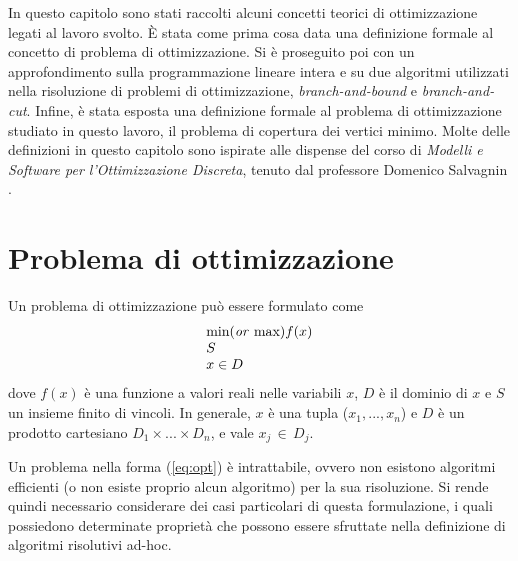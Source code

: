 In questo capitolo sono stati raccolti alcuni concetti teorici di ottimizzazione legati al lavoro svolto. È stata come prima cosa data una definizione formale al concetto di problema di ottimizzazione. Si è proseguito poi con un approfondimento sulla programmazione lineare intera e su due algoritmi utilizzati nella risoluzione di problemi di ottimizzazione, \textit{branch-and-bound} e \textit{branch-and-cut}. Infine, è stata esposta una definizione formale al problema di ottimizzazione studiato in questo lavoro, il problema di copertura dei vertici minimo. Molte delle definizioni in questo capitolo sono ispirate alle dispense del corso di \textsl{Modelli e Software per l'Ottimizzazione Discreta}, tenuto dal professore Domenico Salvagnin \cite{salvagnin1}\cite{salvagnin2}.

\section{Problema di ottimizzazione}
Un problema di ottimizzazione può essere formulato come 
\begin{align}
	\label{eq:opt}
	\begin{array}{l}
      \text{min(\textit{or} max)}f(x)\\
      S	\\
      x \in D
    \end{array}
\end{align}
dove $f(x)$ è una funzione a valori reali nelle variabili $x$, $D$ è il dominio di $x$ e $S$ un insieme finito di vincoli. In generale,  
$x$ è una tupla ($x_1,...,x_n$) e $D$ è un prodotto cartesiano $D_1 \times ... \times D_n$, e vale $x_j \, \in \, D_j$. 

Un problema nella forma (\ref{eq:opt}) è intrattabile, ovvero non esistono algoritmi efficienti (o non esiste proprio
alcun algoritmo) per la sua risoluzione. Si rende quindi necessario considerare dei casi particolari di questa formulazione, i quali 
possiedono determinate proprietà che possono essere sfruttate nella definizione di algoritmi risolutivi ad-hoc.

\newpage
